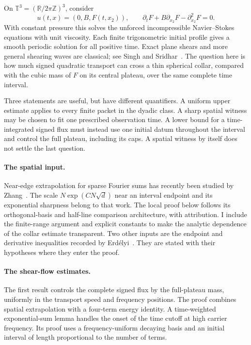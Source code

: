 \documentclass[11pt]{article}
\theoremstyle{definition}
\newcommand{\R}{\mathbb R}
\newcommand{\T}{\mathbb T}
\begin{document}
On \(\T^3=(\R/2\pi\mathbb Z)^3\), consider
\[
 u(t,x)=(0,B,F(t,x_2)),\qquad
 \partial_tF+B\partial_{x_2}F-\partial_{x_2}^2F=0 .
\]
With constant pressure this solves the unforced incompressible
Navier--Stokes equations with unit viscosity. Each finite trigonometric
initial profile gives a smooth periodic solution for all positive time.
Exact plane shears and more general shearing waves are classical;
see Singh and Sridhar~\cite{SinghSridhar2017}. The question here is how
much signed quadratic transport can cross a thin spherical collar,
compared with the cubic mass of \(F\) on its central plateau, over the
same complete time interval.

Three statements are useful, but have different quantifiers.
A uniform upper estimate applies to every finite packet in the dyadic
class. A sharp spatial witness may be chosen to fit one prescribed
observation time. A lower bound for a time-integrated signed flux must
instead use one initial datum throughout the interval and control the
full plateau, including its caps. A spatial witness by itself does not
settle the last question.

\paragraph{The spatial input.}
Near-edge extrapolation for sparse Fourier sums has recently been
studied by Zhang~\cite{Zhang2026}. The scale
\(N\exp(CN\sqrt d)\) near an interval endpoint and its exponential
sharpness belong to that work. The local proof below follows its
orthogonal-basis and half-line comparison architecture, with
attribution. I include the finite-range argument and explicit constants
to make the analytic dependence of the collar estimate transparent.
Two other inputs are the endpoint and derivative inequalities recorded
by Erd\'elyi~\cite{Erdelyi2017}. They are stated with their hypotheses
where they enter the proof.

\paragraph{The shear-flow estimates.}
The first result controls the complete signed flux by the full-plateau
mass, uniformly in the transport speed and frequency positions.
The proof combines spatial extrapolation with a four-term energy
identity. A time-weighted exponential-sum lemma handles the onset of
the time cutoff at high carrier frequency. Its proof uses a
frequency-uniform decaying basis and an initial interval of length
proportional to the number of terms.
\end{document}
